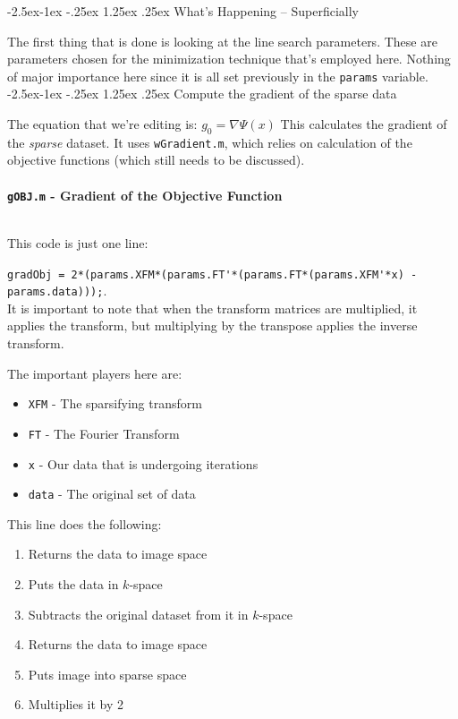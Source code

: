 \documentclass[11 pt]{article}
\makeatletter
\renewcommand\paragraph{\@startsection{paragraph}{4}{\z@}%
            {-2.5ex\@plus -1ex \@minus -.25ex}%
            {1.25ex \@plus .25ex}%
            {\normalfont\normalsize\bfseries}}
\renewcommand\subparagraph{\@startsection{subparagraph}{5}{\z@}%
            {-2.5ex\@plus -1ex \@minus -.25ex}%
            {1.25ex \@plus .25ex}%
            {\normalfont\normalsize\bfseries}}
\newcommand{\bo}{\noindent\textbf}
\makeatother
\begin{document}
      \paragraph{What's Happening -- Superficially}

        The first thing that is done is looking at the line search parameters. These are parameters chosen for the minimization technique that's employed here. Nothing of major importance here since it is all set previously in the \texttt{params} variable.\\

        \subparagraph{Compute the gradient of the sparse data}

         The equation that we're editing is: $g_0 = \nabla\Psi(x)$
         This calculates the gradient of the \emph{sparse} dataset. It uses \texttt{wGradient.m}, which relies on calculation of the objective functions (which still needs to be discussed). \\\\

          \bo{\texttt{gOBJ.m} - Gradient of the Objective Function}
            
            \hfill\\
            \noindent This code is just one line:

            \verb!gradObj = 2*(params.XFM*(params.FT'*(params.FT*(params.XFM'*x) - params.data)));!. \\

            It is important to note that when the transform matrices are multiplied, it applies the transform, but multiplying by the transpose applies the inverse transform.

            The important players here are:
            \begin{itemize}
              \item \texttt{XFM} - The sparsifying transform
              \item \texttt{FT} - The Fourier Transform
              \item \texttt{x} - Our data that is undergoing iterations
              \item \texttt{data} - The original set of data
              \end{itemize}

            This line does the following:

            \begin{enumerate}
              \item Returns the data to image space
              \item Puts the data in $k$-space
              \item Subtracts the original dataset from it in $k$-space
              \item Returns the data to image space
              \item Puts image into sparse space
              \item Multiplies it by 2
              \end{enumerate}
\end{document}
